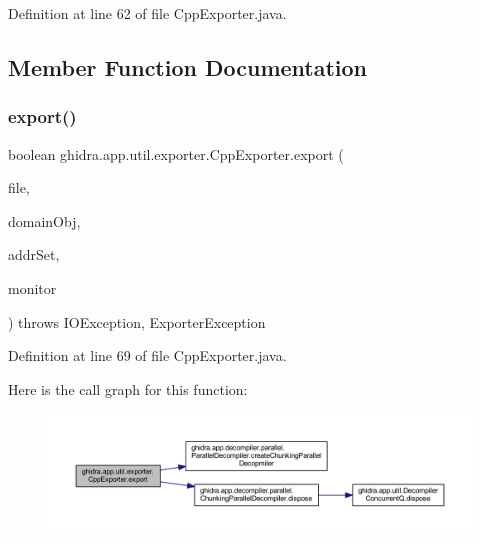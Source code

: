 Definition at line 62 of file Cpp\+Exporter.\+java.



\subsection{Member Function Documentation}
\mbox{\label{classghidra_1_1app_1_1util_1_1exporter_1_1_cpp_exporter_a14744ddee89ddd39c3181638d6f61829}} 
\subsubsection{\texorpdfstring{export()}{export()}}
{\footnotesize\ttfamily boolean ghidra.\+app.\+util.\+exporter.\+Cpp\+Exporter.\+export (\begin{DoxyParamCaption}\item[{File}]{file,  }\item[{Domain\+Object}]{domain\+Obj,  }\item[{Address\+Set\+View}]{addr\+Set,  }\item[{Task\+Monitor}]{monitor }\end{DoxyParamCaption}) throws I\+O\+Exception, Exporter\+Exception\hspace{0.3cm}{\ttfamily [inline]}}



Definition at line 69 of file Cpp\+Exporter.\+java.

Here is the call graph for this function\+:
\nopagebreak
\begin{figure}[H]
\begin{center}
\leavevmode
\includegraphics[width=350pt]{classghidra_1_1app_1_1util_1_1exporter_1_1_cpp_exporter_a14744ddee89ddd39c3181638d6f61829_cgraph}
\end{center}
\end{figure}
\mbox{\label{classghidra_1_1app_1_1util_1_1exporter_1_1_cpp_exporter_a3d2249434f43ed52c0afd1350b61c7f1}} 
